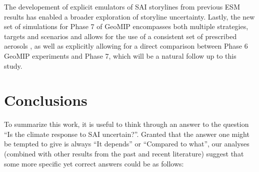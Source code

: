 \documentclass[draft]{agujournal2019}
\begin{document}
The developement of explicit emulators of SAI storylines from previous ESM results \cite{farley2026climate} has enabled a broader exploration of storyline uncertainty. Lastly, the new set of simulations for Phase 7 of GeoMIP encompasses both multiple strategies, targets and scenarios and allows for the use of a consistent set of prescribed aerosols \cite{visioni2026geoengineering}, as well as explicitly allowing for a direct comparison between Phase 6 GeoMIP experiments and Phase 7, which will be a natural follow up to this study. \\

\section{Conclusions}

To summarize this work, it is useful to think through an answer to the question ``Is the climate response to SAI uncertain?''. Granted that the answer one might be tempted to give is always ``It depends'' or ``Compared to what'', our analyses (combined with other results from the past and recent literature) suggest that some more specific yet correct answers could be as follows:
\end{document}
